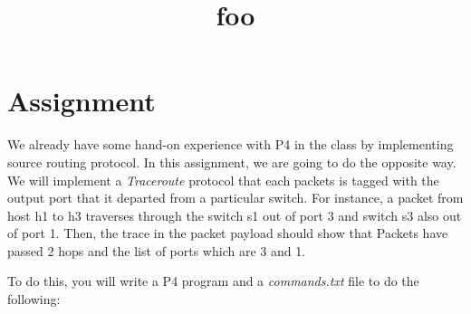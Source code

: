 \documentclass{article}
\title{foo}
\begin{document}




\section*{Assignment}


We already have some hand-on experience with P4 in the class by implementing
source routing protocol. In this assignment, we are going to do the opposite
way. We will implement a \emph{Traceroute} protocol that each packets is tagged
with the output port that it departed from a particular switch. For instance, a
packet from host h1 to h3 traverses through the switch s1 out of port 3 and
switch s3 also out of port 1. Then, the trace in the packet payload should show
that Packets have passed 2 hops and the list of ports which are 3 and 1.


To do this, you will write a P4 program and a \emph{commands.txt} file to do the
following:
\end{document}
